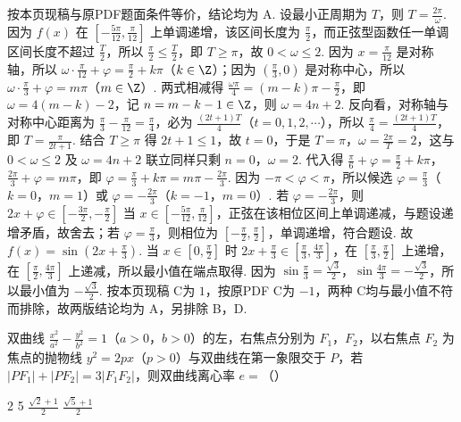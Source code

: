 \documentclass[UTF8,a4paper,oneside,11pt]{ctexbook}
\begin{document}
\begin{solution}
按本页现稿与原PDF题面条件等价，结论均为 A. 设最小正周期为 \(T\)，则 \(T=\frac{2\pi}{\omega}\). 因为 \(f\left( x \right)\) 在 \(\left[ -\frac{5\pi}{12},\frac{\pi}{12} \right]\) 上单调递增，该区间长度为 \(\frac{\pi}{2}\)，而正弦型函数任一单调区间长度不超过 \(\frac{T}{2}\)，所以 \(\frac{\pi}{2}\le \frac{T}{2}\)，即 \(T\ge \pi\)，故 \(0<\omega \le 2\). 因为 \(x=\frac{\pi}{12}\) 是对称轴，所以 \(\omega \cdot \frac{\pi}{12}+\varphi =\frac{\pi}{2}+k\pi\)（\(k\in \Z\)）；因为 \(\left( \frac{\pi}{3},0 \right)\) 是对称中心，所以 \(\omega \cdot \frac{\pi}{3}+\varphi =m\pi\)（\(m\in \Z\)）. 两式相减得 \(\frac{\omega \pi}{4}=\left( m-k \right)\pi -\frac{\pi}{2}\)，即 \(\omega =4\left( m-k \right)-2\)，记 \(n=m-k-1\in \Z\)，则 \(\omega =4n+2\). 反向看，对称轴与对称中心距离为 \(\frac{\pi}{3}-\frac{\pi}{12}=\frac{\pi}{4}\)，必为 \(\frac{\left( 2t+1 \right)T}{4}\)（\(t=0,1,2,\cdots\)），所以 \(\frac{\pi}{4}=\frac{\left( 2t+1 \right)T}{4}\)，即 \(T=\frac{\pi}{2t+1}\). 结合 \(T\ge \pi\) 得 \(2t+1\le 1\)，故 \(t=0\)，于是 \(T=\pi\)，\(\omega =\frac{2\pi}{T}=2\)，这与 \(0<\omega \le 2\) 及 \(\omega =4n+2\) 联立同样只剩 \(n=0\)，\(\omega =2\). 代入得 \(\frac{\pi}{6}+\varphi =\frac{\pi}{2}+k\pi\)，\(\frac{2\pi}{3}+\varphi =m\pi\)，即 \(\varphi =\frac{\pi}{3}+k\pi =m\pi -\frac{2\pi}{3}\). 因为 \(-\pi <\varphi <\pi\)，所以候选 \(\varphi =\frac{\pi}{3}\)（\(k=0\)，\(m=1\)）或 \(\varphi =-\frac{2\pi}{3}\)（\(k=-1\)，\(m=0\)）. 若 \(\varphi =-\frac{2\pi}{3}\)，则 \(2x+\varphi \in \left[ -\frac{3\pi}{2},-\frac{\pi}{2} \right]\) 当 \(x\in \left[ -\frac{5\pi}{12},\frac{\pi}{12} \right]\)，正弦在该相位区间上单调递减，与题设递增矛盾，故舍去；若 \(\varphi =\frac{\pi}{3}\)，则相位为 \(\left[ -\frac{\pi}{2},\frac{\pi}{2} \right]\)，单调递增，符合题设. 故 \(f\left( x \right)=\sin \left( 2x+\frac{\pi}{3} \right)\). 当 \(x\in \left[ 0,\frac{\pi}{2} \right]\) 时 \(2x+\frac{\pi}{3}\in \left[ \frac{\pi}{3},\frac{4\pi}{3} \right]\)，在 \(\left[ \frac{\pi}{3},\frac{\pi}{2} \right]\) 上递增，在 \(\left[ \frac{\pi}{2},\frac{4\pi}{3} \right]\) 上递减，所以最小值在端点取得. 因为 \(\sin \frac{\pi}{3}=\frac{\sqrt{3}}{2}\)，\(\sin \frac{4\pi}{3}=-\frac{\sqrt{3}}{2}\)，所以最小值为 \(-\frac{\sqrt{3}}{2}\). 按本页现稿 C为 \(1\)，按原PDF C为 \(-1\)，两种 C均与最小值不符而排除，故两版结论均为 A，另排除 B，D.
\end{solution}

\begin{problem}
双曲线 \(\frac{x^2}{a^2}-\frac{y^2}{b^2}=1\)（\(a>0\)，\(b>0\)）的左，右焦点分别为 \(F_1\)，\(F_2\)，以右焦点 \(F_2\) 为焦点的抛物线 \(y^2=2px\)（\(p>0\)）与双曲线在第一象限交于 \(P\)，若 \(|PF_1|+|PF_2|=3|F_1F_2|\)，则双曲线离心率 \(e=\)（\quad）

\choices
    {2}
    {5}
    {\(\frac{\sqrt2+1}{2}\)}
    {\(\frac{\sqrt5+1}{2}\)}
\end{problem}
\end{document}
